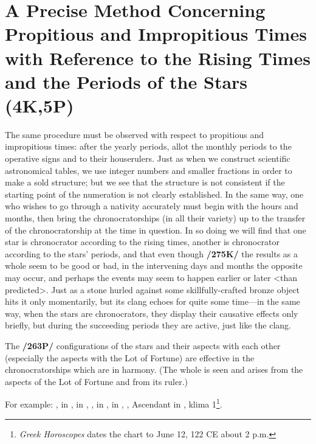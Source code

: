\section{A Precise Method Concerning Propitious and Impropitious Times with Reference to the Rising Times and the Periods of the Stars (4K,5P)}

The same procedure must be observed with respect to propitious and impropitious times: after the yearly periods, allot the monthly periods to the operative signs and to their houserulers. Just as when we construct scientific astronomical tables, we use integer numbers and smaller fractions in order to make a sold structure; but we see that the structure is not consistent if the starting point of the numeration is not
clearly established. In the same way, one who wishes to go through a nativity accurately must begin with the hours and months, then bring the chronocratorships (in all their variety) up to the transfer of the
chronocratorship at the time in question. In so doing we will find that one star is chronocrator according to the rising times, another is chronocrator according to the stars’ periods, and that even though \textbf{/275K/} the results as a whole seem to be good or bad, in the intervening days and months the opposite may occur, and perhaps the events may seem to happen earlier or later <than predicted>. Just as a stone hurled against some skillfully-crafted bronze object hits it only momentarily, but its clang echoes for quite some time—in the same way, when the stars are chronocrators, they display their causative effects only briefly, but during the succeeding periods they are active, just like the clang. 

The \textbf{/263P/} configurations of the stars and their aspects with each other (especially the aspects with the Lot of Fortune) are effective in the chronocratorships which are in harmony. (The whole is seen and arises from the aspects of the Lot of Fortune and from its ruler.)

\newpage
For example: \Sun, \Mercury\xspace in \Gemini, \Moon\xspace in \Aquarius, \Saturn, \Venus\xspace in \Leo, \Jupiter\xspace in
\Sagittarius, \Mars, Ascendant in \Libra, klima 1\footnote{\textit{Greek Horoscopes} dates the chart to June 12, 122 CE about 2 p.m.}. 

